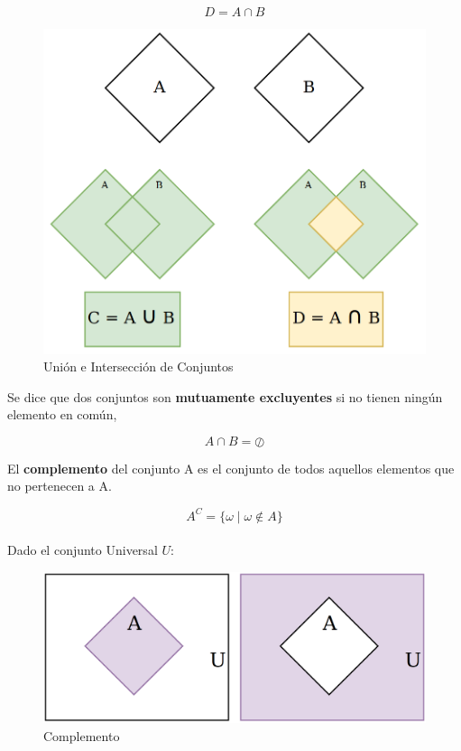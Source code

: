 \begin{equation}
D = A \cap B
\label{eqn:interseccion}
\end{equation}

\begin{figure}[H]
\centering
\includegraphics[scale=0.3]{Figures/Conjuntos.png}
    \caption{Unión e Intersección de Conjuntos}
    \label{fig:UnioneInterseccion}
\end{figure}

Se dice que dos conjuntos son \textbf{mutuamente excluyentes} si no tienen ningún elemento en común, 

\begin{equation}
A \cap B = \oslash
\label{eqn:mutuamente_excluyentes}
\end{equation}

El \textbf{complemento} del conjunto A es el conjunto de todos aquellos elementos que no pertenecen a A.

\begin{equation}
A^{C} = \{\omega \mid \omega \notin A\}
\label{eqn:complemento}
\end{equation}
\phantom{sdlf}\\
Dado el conjunto Universal $U$:
\begin{figure}[H]
\centering
\includegraphics[scale=0.17]{Figures/Conjuntos_Complemento.png}
    \caption{Complemento}
    \label{fig:Complemento}
\end{figure}

